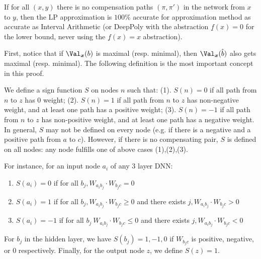 	
	
	
	
	\begin{theorem}
		\label{th1}
		If for all $(x,y)$ there is no compensation paths $(\pi,\pi')$ 
		in the network from $x$ to $y$, then the LP approximation is 
		$100\%$ accurate for approximation method as accurate as Interval Arithmetic (or DeepPoly with the abstraction $\underline{f}(x) = 0$ for the lower bound, never using the $\underline{f}(x) = x$ abstraction). 
	\end{theorem}
	
	
	
	First, notice that if $\Val_{\boldsymbol{x}}(b)$ is maximal (resp. minimal), 
	then $\Val_{\boldsymbol{x}}(\hat{b})$ also gets maximal (resp. minimal).
	The following definition is the most important concept in this proof.
	
	\begin{definition}\label{sign_of_nodes}
		We define a sign function $S$ on nodes $n$ such that: 	(1). $S(n)=0$ if all path from $n$ to $z$ has 0 weight; (2). $S(n)=1$ if all path from $n$ to $z$ has non-negative weight, and at least one path has a positive weight; (3). $S(n)=-1$ if all path from $n$ to $z$ has non-positive weight, and at least one path has a negative weight. 
		In general, $S$ may not be defined on every node (e.g. if there is a negative and a positive path from $a$ to $c$). However, if there is no compensating pair, $S$ is defined on all nodes: any node fulfills one of above cases (1),(2),(3).
		
		
		For instance, for an input node $a_i$ of any 3 layer DNN:
		\begin{enumerate}
			\item  $S(a_i)=0$ if 
			for all $b_j, W_{a_i b_j}\cdot W_{b_j c} = 0$
			
			
			\item  $S(a_i)=1$ if for all $b_j, W_{a_i b_j}\cdot W_{b_j c} \geq 0$ and there exists 
			$j, W_{a_i b_j}\cdot W_{b_j c} > 0$
			
			\item $S(a_i)=-1$ if for all $b_j\ W_{a_i b_j}\cdot W_{b_j c} \leq 0$ and there exists 
			$j, W_{a_i b_j}\cdot W_{b_j c} < 0$ 
		\end{enumerate}
		
		For $b_j$ in the hidden layer, we have $S(b_j)=1,-1,0$ if $W_{b_j c}$ is positive, negative, or 0 respectively. Finally, for the output node $z$, we define $S(z)=1$.
	\end{definition}
	
